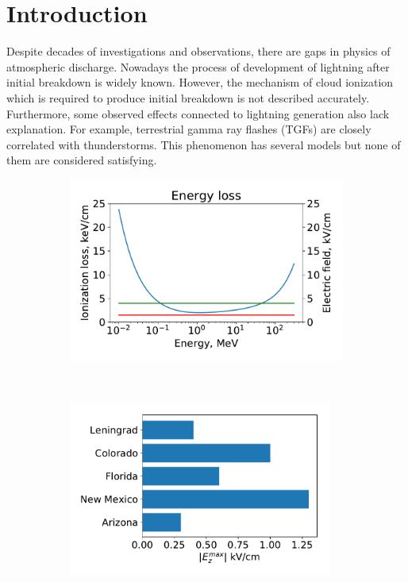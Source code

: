 \documentclass[utf8]{webofc}
\begin{document}
    \section{Introduction}
    Despite decades of investigations and observations, there are gaps in physics of atmospheric discharge. Nowadays the process of development of lightning after initial breakdown is widely known. However, the mechanism of cloud ionization which is required to produce initial breakdown is not described accurately. Furthermore, some observed effects connected to lightning generation also lack explanation. For example, terrestrial gamma ray flashes (TGFs) are closely correlated with thunderstorms. This phenomenon has several models but none of them are considered satisfying.
    \begin{figure}[ht!]
        \begin{subfigure}[b]{0.5\textwidth}
            \includegraphics[width=0.95\linewidth]{pictures/01_Gurevich}
            \caption{}
            \label{pic-gurevich-a}
        \end{subfigure}
        ~
        \begin{subfigure}[b]{0.5\textwidth}
            \includegraphics[width=0.95\textwidth]{pictures/03_extremal_field}

\end{subfigure}
\end{figure}
\end{document}
